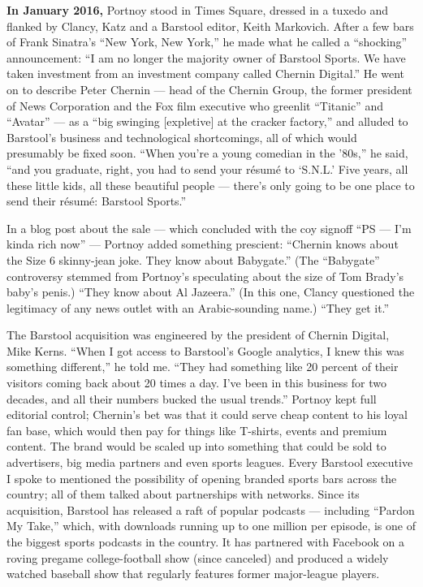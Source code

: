 \textbf{In January 2016,} Portnoy stood in Times Square, dressed in a
tuxedo and flanked by Clancy, Katz and a Barstool editor, Keith
Markovich. After a few bars of Frank Sinatra's ``New York, New York,''
he made what he called a ``shocking'' announcement: ``I am no longer the
majority owner of Barstool Sports. We have taken investment from an
investment company called Chernin Digital.'' He went on to describe
Peter Chernin --- head of the Chernin Group, the former president of
News Corporation and the Fox film executive who greenlit ``Titanic'' and
``Avatar'' --- as a ``big swinging {[}expletive{]} at the cracker
factory,'' and alluded to Barstool's business and technological
shortcomings, all of which would presumably be fixed soon. ``When you're
a young comedian in the '80s,'' he said, ``and you graduate, right, you
had to send your résumé to `S.N.L.' Five years, all these little kids,
all these beautiful people --- there's only going to be one place to
send their résumé: Barstool Sports.''

In a blog post about the sale --- which concluded with the coy signoff
``PS --- I'm kinda rich now'' --- Portnoy added something prescient:
``Chernin knows about the Size 6 skinny-jean joke. They know about
Babygate.'' (The ``Babygate'' controversy stemmed from Portnoy's
speculating about the size of Tom Brady's baby's penis.) ``They know
about Al Jazeera.'' (In this one, Clancy questioned the legitimacy of
any news outlet with an Arabic-sounding name.) ``They get it.''

The Barstool acquisition was engineered by the president of Chernin
Digital, Mike Kerns. ``When I got access to Barstool's Google analytics,
I knew this was something different,'' he told me. ``They had something
like 20 percent of their visitors coming back about 20 times a day. I've
been in this business for two decades, and all their numbers bucked the
usual trends.'' Portnoy kept full editorial control; Chernin's bet was
that it could serve cheap content to his loyal fan base, which would
then pay for things like T-shirts, events and premium content. The brand
would be scaled up into something that could be sold to advertisers, big
media partners and even sports leagues. Every Barstool executive I spoke
to mentioned the possibility of opening branded sports bars across the
country; all of them talked about partnerships with networks. Since its
acquisition, Barstool has released a raft of popular podcasts ---
including ``Pardon My Take,'' which, with downloads running up to one
million per episode, is one of the biggest sports podcasts in the
country. It has partnered with Facebook on a roving pregame
college-football show (since canceled) and produced a widely watched
baseball show that regularly features former major-league players.

